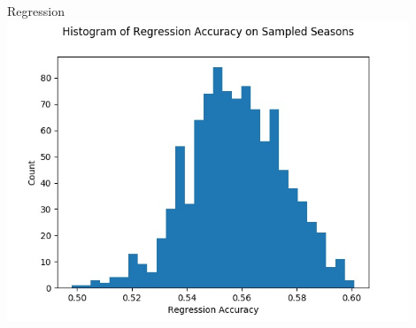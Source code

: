 \documentclass{beamer}
\begin{document}
\begin{frame}{Regression}
    \includegraphics[width=0.9\textwidth]{hist_acc.jpg}
\end{frame}
\end{document}
